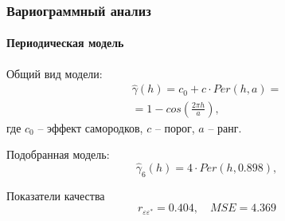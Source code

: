 \documentclass{beamer}
\begin{document}
\begin{frame}
  \frametitle{Вариограммный анализ}
  \framesubtitle{Периодическая модель}
  \begin{multicols}{2}
    \begin{small}
      Общий вид модели:
      \begin{eqnarray}
      \label{eq:per}
        \widehat{\gamma}(h) = c_0 + c \cdot Per(h, a) = \\ = 1 - cos(\frac{2 \pi h}{a}), \nonumber
      \end{eqnarray}
      где $ c_0 $ -- эффект самородков, $ c $ -- порог, $ a $ -- ранг.
      
      \medskip
      
      Подобранная модель:
      \begin{equation}
      \label{eq:gamma6}
        \widehat{\gamma}_6(h) = 4 \cdot Per(h, 0.898),
      \end{equation}
      
      Показатели качества
      \begin{equation*}
        r_{\varepsilon\varepsilon^{*}} = 0.404, \quad MSE = 4.369
      \end{equation*}
    \end{small}
    

\end{multicols}
\end{frame}
\end{document}
